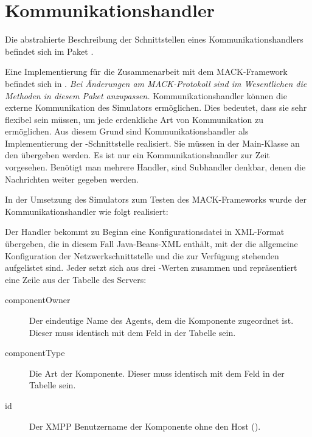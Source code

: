 \section{Kommunikationshandler}\label{subsec:real_communication}
Die abstrahierte Beschreibung der Schnittstellen eines Kommunikationshandlers befindet sich im Paket . 

Eine Implementierung für die Zusammenarbeit mit dem MACK-Framework befindet sich in . \emph{Bei Änderungen am MACK-Protokoll sind im Wesentlichen die Methoden in diesem Paket anzupassen.}
Kommunikationshandler können die externe Kommunikation des Simulators ermöglichen. Dies bedeutet, dass sie sehr flexibel sein müssen, um jede erdenkliche Art von Kommunikation zu ermöglichen. Aus diesem Grund sind Kommunikationshandler als Implementierung der -Schnittstelle realisiert. Sie müssen in der Main-Klasse  an den  übergeben werden. Es ist nur ein Kommunikationshandler zur Zeit vorgesehen. Benötigt man mehrere Handler, sind Subhandler denkbar, denen die Nachrichten weiter gegeben werden.

In der Umsetzung des Simulators zum Testen des MACK-Frameworks wurde der Kommunikationshandler  wie folgt realisiert:

Der Handler bekommt zu Beginn eine Konfigurationsdatei in XML-Format übergeben, die in diesem Fall Java-Beans-XML enthält, mit der die allgemeine Konfiguration der Netzwerkschnittstelle und die zur Verfügung stehenden  aufgelistet sind. Jeder  setzt sich aus drei -Werten zusammen und repräsentiert eine Zeile aus der Tabelle  des Servers:\begin{description}
	\item[componentOwner] Der eindeutige Name des Agents, dem die Komponente zugeordnet ist. Dieser  muss identisch mit dem Feld  in der Tabelle  sein.
	\item[componentType] Die Art der Komponente. Dieser  muss identisch mit dem Feld  in der Tabelle sein.
	\item[id] Der XMPP Benutzername der Komponente ohne den Host ().
\end{description}

